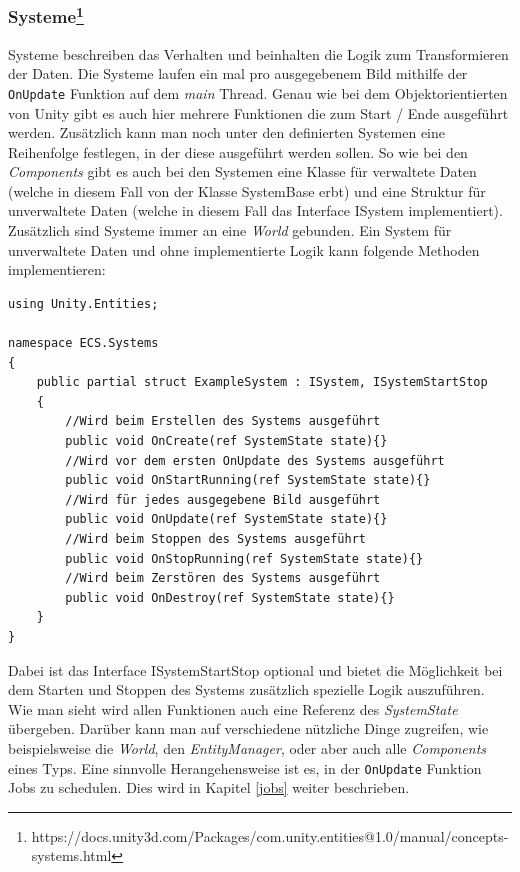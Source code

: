 \documentclass[12pt, titlepage]{article}
\DeclareRobustCommand{\#}{\adjustbox{valign=B,totalheight=.57\baselineskip}{\oldhash}}%
\begin{document}
\subsubsection{Systeme\footnote{https://docs.unity3d.com/Packages/com.unity.entities@1.0/manual/concepts-systems.html}}
Systeme beschreiben das Verhalten und beinhalten die Logik zum Transformieren der Daten. Die Systeme laufen ein mal pro ausgegebenem Bild mithilfe der \texttt{OnUpdate} Funktion auf dem \textit{main} Thread. Genau wie bei dem Objektorientierten von Unity gibt es auch hier mehrere Funktionen die zum Start / Ende ausgeführt werden. Zusätzlich kann man noch unter den definierten Systemen eine Reihenfolge festlegen, in der diese ausgeführt werden sollen. So wie bei den \textit{Components} gibt es auch bei den Systemen eine Klasse für verwaltete Daten (welche in diesem Fall von der Klasse SystemBase erbt) und eine Struktur für unverwaltete Daten (welche in diesem Fall das Interface ISystem implementiert). Zusätzlich sind Systeme immer an eine \textit{World} gebunden. Ein System für unverwaltete Daten und ohne implementierte Logik kann folgende Methoden implementieren:
\begin{lstlisting}[style=code, caption={System Beispiel}]
using Unity.Entities;

namespace ECS.Systems
{
    public partial struct ExampleSystem : ISystem, ISystemStartStop
    {
        //Wird beim Erstellen des Systems ausgeführt
        public void OnCreate(ref SystemState state){}
        //Wird vor dem ersten OnUpdate des Systems ausgeführt
        public void OnStartRunning(ref SystemState state){}
        //Wird für jedes ausgegebene Bild ausgeführt
        public void OnUpdate(ref SystemState state){}
        //Wird beim Stoppen des Systems ausgeführt
        public void OnStopRunning(ref SystemState state){}
        //Wird beim Zerstören des Systems ausgeführt
        public void OnDestroy(ref SystemState state){}
    }
}
\end{lstlisting}
Dabei ist das Interface ISystemStartStop optional und bietet die Möglichkeit bei dem Starten und Stoppen des Systems zusätzlich spezielle Logik auszuführen. Wie man sieht wird allen Funktionen auch eine Referenz des \textit{SystemState} übergeben. Darüber kann man auf verschiedene nützliche Dinge zugreifen, wie beispielsweise die \textit{World}, den \textit{EntityManager}, oder aber auch alle \textit{Components} eines Typs. Eine sinnvolle Herangehensweise ist es, in der \texttt{OnUpdate} Funktion Jobs zu schedulen. Dies wird in Kapitel \ref{jobs} weiter beschrieben.
\end{document}
